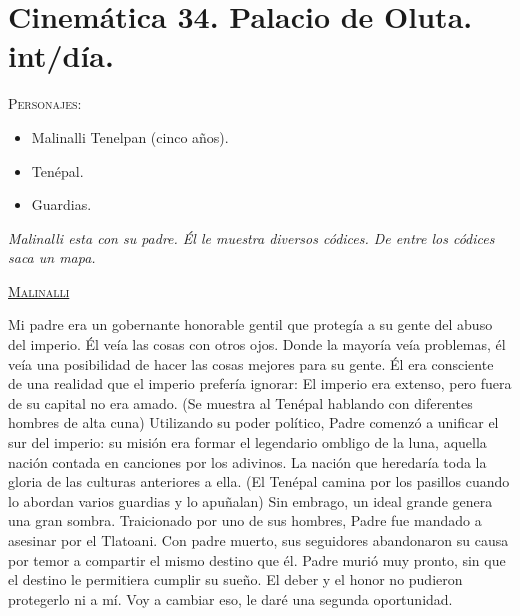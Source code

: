 \section{Cinemática 34. Palacio de Oluta. int/día. }
\label{Cin:Cinematica34}
 \textsc{Personajes}:
 \begin{itemize}
 \item Malinalli Tenelpan (cinco años).
\item Tenépal.
\item Guardias.
 \end{itemize}
\textit{Malinalli esta con su padre. Él le muestra diversos códices. De entre los códices saca un mapa.}
\begin{center}
\textsc{\underline{Malinalli}}
\\
\par
Mi padre era un gobernante honorable gentil que protegía a su gente del abuso del imperio. Él veía las cosas con otros ojos. Donde la mayoría veía problemas, él veía una posibilidad de hacer las cosas mejores para su gente. Él era consciente de una realidad que el imperio prefería ignorar: El imperio era extenso, pero fuera de su capital no era amado. (Se muestra al Tenépal hablando con diferentes hombres de alta cuna) Utilizando su poder político, Padre comenzó a unificar el sur del imperio: su misión era formar el legendario ombligo de la luna, aquella nación contada en canciones por los adivinos. La nación que heredaría toda la gloria de las culturas anteriores a ella. (El Tenépal camina por los pasillos cuando lo abordan varios guardias y lo apuñalan) Sin embrago, un ideal grande genera una gran sombra. Traicionado por uno de sus hombres, Padre fue mandado a asesinar por el Tlatoani. Con padre muerto, sus seguidores abandonaron su causa por temor a compartir el mismo destino que él. Padre murió muy pronto, sin que el destino le permitiera cumplir su sueño. El deber y el honor no pudieron protegerlo ni a mí. Voy a cambiar eso, le daré una segunda oportunidad.
\end{center}